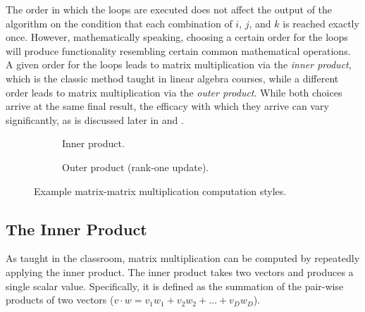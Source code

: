 \documentclass[\main/thesis.tex]{subfiles}
\begin{document}
The order in which the loops are executed does not affect the output of the algorithm on the condition that each combination of $i$, $j$, and $k$ is reached exactly once.
However, mathematically speaking, choosing a certain order for the loops will produce functionality resembling certain common mathematical operations.
A given order for the loops leads to matrix multiplication via the \emph{inner product}, which is the classic method taught in linear algebra courses, while a different order leads to matrix multiplication via the \emph{outer product}.
While both choices arrive at the same final result, the efficacy with which they arrive can vary significantly, as is discussed later in  and .

\begin{figure}[t]
 \hfill
  \begin{subfigure}{.45\linewidth}
    \centering
    \caption{Inner product.}
    \label{fig:innerProduct}
  \end{subfigure}
 \hfill
  \begin{subfigure}{.45\linewidth}
    \centering
  \caption{Outer product (rank-one update).}
    \label{fig:outerProduct}
  \end{subfigure}
  \hfill
  \caption[Matrix-Matrix Multiplication Computation Styles]{Example matrix-matrix multiplication computation styles.}
  \label{fig:product}
  \vspace{-0.15cm}
\end{figure}

\subsection{The Inner Product}
As taught in the classroom, matrix multiplication can be computed by repeatedly applying the inner product.
The inner product takes two vectors and produces a single scalar value.
Specifically, it is defined as the summation of the pair-wise products of two vectors (\eg $v \cdot w=v_{1}w_{1} + v_{2}w_{2} + \ldots + v_{D}w_{D}$).
\end{document}
